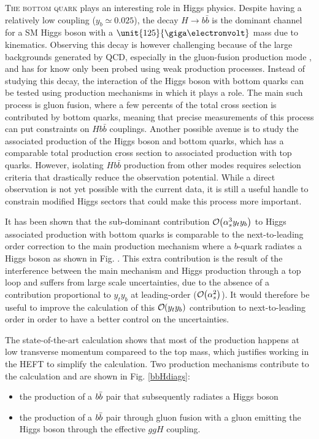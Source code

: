 \lettrine[findent=0.2em,nindent=0.2em]{T}{he bottom quark} plays an interesting role in Higgs physics. Despite having a relatively low coupling ($y_b\simeq 0.025$), the decay $H\to b\bar b$ is the dominant channel for a SM Higgs boson with a $\unit{125}{\giga\electronvolt}$ mass due to kinematics. Observing this decay is however challenging because of the large backgrounds generated by QCD, especially in the gluon-fusion production mode \cite{TheATLASCollaboration2016}, and has for know only been probed using weak production processes. Instead of studying this decay, the interaction of the Higgs boson with bottom quarks can be tested using production mechanisms in which it plays a role. The main such process is gluon fusion, where a few percents of the total cross section is contributed by bottom quarks, meaning that precise measurements of this process can put constraints on $Hb\bar b$ couplings. Another possible avenue is to study the associated production of the Higgs boson and bottom quarks, which has a comparable total production cross section to associated production with top quarks. However, isolating $Hb\bar b$ production from other modes requires selection criteria that drastically reduce the observation potential. While a direct observation is not yet possible with the current data, it is still a useful handle to constrain modified Higgs sectors that could make this process more important.

It has been shown \cite{Wiesemann:2014ioa} that the sub-dominant contribution ${\cal O}\hspace{-0.2em}\left(\alpha_s^3 y_t y_b\right)$ to Higgs associated production with bottom quarks is comparable to the next-to-leading order correction to the main production mechanism where a $b$-quark radiates a Higgs boson as shown in Fig. . This extra contribution is the result of the interference between the main mechanism and Higgs production through a top loop and suffers from large scale uncertainties, due to the absence of a contribution proportional to $y_t y_b$ at leading-order (${\cal O}\hspace{-0.2em}\left(\alpha_s^2\right)$). It would therefore be useful to improve the calculation of this ${\cal O}\hspace{-0.2em}\left(y_ty_b\right)$ contribution to next-to-leading order in order to have a better control on the uncertainties.

The state-of-the-art calculation shows that most of the production happens at low transverse momentum compareed to the top mass, which justifies working in the HEFT to simplify the calculation. Two production mechanisms contribute to the calculation and are shown in Fig. \ref{bbHdiags}:
\begin{itemize}
  \item the production of a $b \bar b$ pair that subsequently radiates a Higgs boson
  \item the production of a $b \bar b$ pair through gluon fusion with a gluon emitting the Higgs boson through the effective $ggH$ coupling.
\end{itemize}

